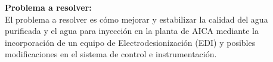 \textbf{Problema a resolver:}\\
El problema a resolver es cómo mejorar y estabilizar la calidad del agua purificada y el agua para inyección en la planta de AICA mediante la incorporación de un equipo de Electrodesionización (EDI) y posibles modificaciones en el sistema de control e instrumentación.

